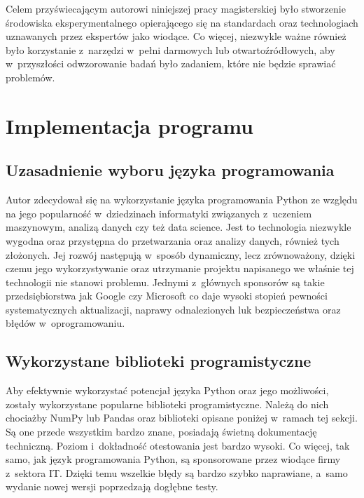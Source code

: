 \documentclass[../Kamil_Kowalewski_Main.tex]{subfiles}
\begin{document}
 {

    Celem przyświecającym autorowi niniejszej pracy magisterskiej było stworzenie
    środowiska eksperymentalnego opierającego się na standardach oraz technologiach
    uznawanych przez ekspertów jako wiodące. Co więcej, niezwykle ważne również było
    korzystanie z~narzędzi w~pełni darmowych lub otwartoźródłowych, aby w~przyszłości
    odwzorowanie badań było zadaniem, które nie będzie sprawiać problemów.

    \section{Implementacja programu}
    \label{chapter4:srodowisko_eksperymentalne:impl_programu} {

        \subsection{Uzasadnienie wyboru języka programowania}
        \label{chapter4:srodowisko_eksperymentalne:impl_programu:jezyk} {
            Autor zdecydował się na wykorzystanie języka programowania
            Python\cite{website:python} ze względu na jego popularność w~dziedzinach
            informatyki związanych z~uczeniem maszynowym, analizą danych czy też data
            science. Jest to technologia niezwykle wygodna oraz przystępna do
            przetwarzania oraz analizy danych, również tych złożonych. Jej rozwój
            następują w~sposób dynamiczny, lecz zrównoważony, dzięki czemu jego
            wykorzystywanie oraz utrzymanie projektu napisanego we właśnie tej
            technologii nie stanowi problemu. Jednymi z~głównych sponsorów są takie
            przedsiębiorstwa jak Google\cite{website:google} czy
            Microsoft\cite{website:microsoft} co daje wysoki stopień pewności
            systematycznych aktualizacji, naprawy odnalezionych luk bezpieczeństwa oraz
            błędów w~oprogramowaniu.
        }

        \subsection{Wykorzystane biblioteki programistyczne}
        \label{chapter4:srodowisko_eksperymentalne:impl_programu:bib} {
            Aby efektywnie wykorzystać potencjał języka Python oraz jego możliwości,
            zostały wykorzystane popularne biblioteki programistyczne. Należą do nich
            chociażby NumPy\cite{website:numpy} lub Pandas\cite{website:pandas} oraz
            biblioteki opisane poniżej w~ramach tej sekcji. Są one przede wszystkim
            bardzo znane, posiadają świetną dokumentację techniczną. Poziom
            i~dokładność otestowania jest bardzo wysoki. Co więcej, tak samo, jak język
            programowania Python, są sponsorowane przez wiodące firmy z~sektora IT.
            Dzięki temu wszelkie błędy są bardzo szybko naprawiane, a~samo wydanie nowej
            wersji poprzedzają dogłębne testy.

}}}
\end{document}
